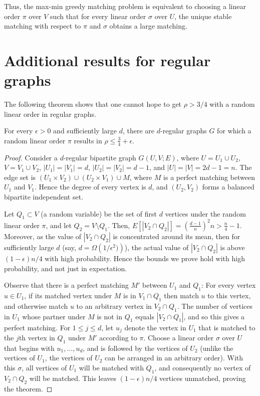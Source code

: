 \documentclass{toc}
\theoremstyle{plain}
\begin{document}
%
Thus, the max-min greedy matching problem 
%
is equivalent to %
choosing a %
linear order $\pi$ over $V$ such that for every %
linear order $\sigma$ over $U$, the unique stable matching with respect to $\pi$ and $\sigma$ obtains a large matching.

%
%
%
%
%
%
%
%
%
%
%
%
%
%
%
%
%
%
%
%
%
%
%
%
%
%
%
%
%
%
%
%
%
%

%
%

\section{Additional results for regular graphs}
\label{sec:additional}

The following theorem shows that one cannot hope to get $\rho > 3/4$ with a random linear order in regular graphs.


%
\begin{theorem}
	\label{thm:3-4}
	For every $\epsilon > 0$ and sufficiently large $d$, there are $d$-regular graphs $G$ for which a random linear order $\pi$ results in $\rho \le \frac{3}{4} + \epsilon$.
\end{theorem}


\begin{proof}
	Consider a $d$-regular bipartite graph $G(U,V;E)$, where $U = U_1 \cup U_2$, $V = V_1 \cup V_2$,   $|U_1| = |V_1| = d$, $|U_2| = |V_2| = d-1$, and $|U| = |V| = 2d-1 = n$. The edge set is $(U_1 \times V_2) \cup (U_2 \times V_1) \cup M$, where $M$ is a perfect matching between $U_1$ and $V_1$. Hence the degree of every vertex is $d$, and $(U_2,V_2)$ forms 
	a balanced bipartite independent set.
	
	Let $Q_1 \subset V$ (a random variable) be the set of first $d$ vertices under the random linear order $\pi$, and let $Q_2 = V \setminus Q_1$. Then, $E[|V_2 \cap Q_2|] =  (\frac{d-1}{n})^2 n > \frac{n}{4} - 1$. Moreover, as the value of $|V_2 \cap Q_2|$ is concentrated around its mean, then for sufficiently large $d$ (say,
%
$d = \Omega\left(1/\epsilon^2)\right)$),    %
the actual value of $|V_2 \cap Q_2|$ is above 
%
$(1 - \epsilon)n/4$  %
with high probability. Hence the bounds we prove hold with high probability, and not just in expectation.
	
	Observe that there is a perfect matching $M'$ between $U_1$ and $Q_1$: For every vertex $u\in U_1$, if its matched vertex under $M$ is in $V_1 \cap Q_1$ then match $u$ to this vertex, and otherwise match $u$ to an arbitrary vertex in $V_2 \cap Q_1$. The number of vertices in $U_1$ whose partner under $M$ is not in $Q_1$ equals $|V_2 \cap Q_1|$, and so this gives a perfect matching. 
	For $1 \le j \le d$, let $u_j$ denote the vertex in $U_1$ that is matched to the $j$th vertex in $Q_1$ under $M'$ according to $\pi$. 
	Choose a linear order $\sigma$ over $U$ that begins with $u_1, \ldots, u_d$, and is followed by the vertices of $U_2$ (unlike the vertices of $U_1$, the vertices of $U_2$ can be arranged in an arbitrary order). With this $\sigma$, all vertices of $U_1$ will be matched with $Q_1$, and consequently no vertex of $V_2 \cap Q_2$ will be matched. This leaves
%
$(1 - \epsilon)n/4$   %
vertices unmatched, proving the theorem.
\end{proof}
\end{document}
